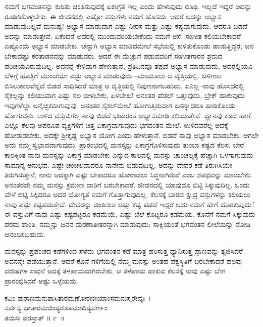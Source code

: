 ನಮಗೆ ಭಗವಂತನನ್ನು ಕುರಿತು ಚಿಂತಿಸುವುದಕ್ಕೆ ಏಕಾಗ್ರತೆ ಇಲ್ಲ ಎಂದು ಹೇಳುವುದು ರೂಢಿ. ಇಲ್ಲದೆ ಇದ್ದರೆ ಅದನ್ನು ರೂಢಿಸಿಕೊಳ್ಳಬೇಕು. ಈ ಜೀವನದಲ್ಲಿ ಎಷ್ಟೋ ವಸ್ತುಗಳು ನಮಗೆ ಹೊಸದು. ಆದರೆ ಅದನ್ನು ಅಭ್ಯಾಸ ಮಾಡುವುದಿಲ್ಲವೆ ಮನುಷ್ಯ! ಅಭ್ಯಾಸ ಮಾಡುವಾಗ ಎಷ್ಟು ನೀರಸ ಮತ್ತು ಎಷ್ಟು ಕಷ್ಟವಾಗುವುದು. ಆದರೂ ಬಿಡದೆ ಅದನ್ನು ಮಾಡುತ್ತೇವೆ. ಏಕೆಂದರೆ ಅದರಲ್ಲಿ ಮುಂದುವರಿಯಬೇಕೆಂದು ನಮಗೆ ಆಸೆ. ಸಂಗೀತ ಕಲಿಯಬೇಕಾದರೆ ಎಷ್ಟೊಂದು ಅಭ್ಯಾಸ ಮಾಡಬೇಕು. ಚೆನ್ನಾಗಿ ಅಭ್ಯಾಸ ಮಾಡಿದಮೇಲೆ ಸಭೆಯಲ್ಲಿ ಕುಳಿತುಕೊಂಡು ಹಾಡುತ್ತಿದ್ದರೆ, ಜನ ಬೇಕಾದಷ್ಟು ಕರತಾಡನವನ್ನು ಮಾಡುವರು. ಆದರೆ ಈ ಮೆಚ್ಚುಗೆ ಪಡುವವರಿಗೆ ಸಂಗೀತಗಾರನ ಶ್ರಮದ ಪರಿಚಯವಿರುವುದಿಲ್ಲ. ಅವನನ್ನೆ ಕೇಳಿದಾಗ ಹೇಳುತ್ತಾನೆ, ಪ್ರತಿದಿನವೂ ತಪ್ಪದೆ ಅಭ್ಯಾಸ ಮಾಡುವುದು, ಅದರಲ್ಲಿಯೂ ಬೆಳಗ್ಗೆ ಹೊತ್ತಿಗೆ ಮುಂಚೆಯೇ ಎದ್ದು ಅಭ್ಯಾಸ ಮಾಡುವುದು –ಮಾಮೂಲು ಆ ವೃತ್ತಿಯಲ್ಲಿ. ಚಳಿಗಾಲ ಬಿಸಿಲುಕಾಲವೆನ್ನದೆ ಬಿಡದೆ ಸಾಧಿಸಿದರೆ ಮಾತ್ರ ಆ ವೃತ್ತಿಯಲ್ಲಿ ನಿಪುಣನಾಗಬಹುದು. ಏನಿಲ್ಲ–ನಾವು ಹೊಸದರಲ್ಲಿ ಸೈಕಲ್ಲನ್ನು ಕಲಿಯುವಾಗ ಎಷ್ಟು ಸಲ ಬೀಳಬೇಕು, ಏಳಬೇಕು! ಅನಂತರ ಪೆಡಲ್ ಒತ್ತುವುದು, ಬ್ರೇಕ್ ಹಾಕುವುದು ಇವುಗಳೆಲ್ಲಾ ಅನೈಚ್ಛಿಕವಾಗುವುವು. ಅನಂತರ ಸೈಕಲ್​ಮೇಲೆ ಹೋಗುತ್ತಿರುವಾಗ ಏನನ್ನಾದರೂ ಹಾಡಿಕೊಂಡು ಹೋಗುವನು. ಉಳಿದ ವಸ್ತುವಿಗೆಲ್ಲ ನಾವು ಬಿಡದೆ ಭಂಡರಂತೆ ಅಭ್ಯಾಸಮಾಡಿ ಕಲಿಯುತ್ತೇವೆ. ಧ್ಯಾನವು ಕೂಡ ಹಾಗೆ. ಎಲ್ಲೊ ಕೆಲವು ಅಪರೂಪ ವ್ಯಕ್ತಿಗಳಿಗೆ ಚಿತ್ತ ಏಕಾಗ್ರವಾಗುವುದು ಭಗವಂತನ ಮೇಲೆ. ಉಳಿದವರೆಲ್ಲ ಅದಕ್ಕೆ ಹೋರಾಡಬೇಕು. ಅದಕ್ಕೇ ಶ‍್ರೀಕೃಷ್ಣ ಅಭ್ಯಾಸ ಯೋಗ ಎಂದು ಹೇಳುತ್ತಾನೆ. ಬಿಡದೆ ನಾವು ಅಭ್ಯಾಸ ಮಾಡಬೇಕು. ಆಗಲೇ ಅದು ನಮ್ಮ ಸ್ವಭಾವವಾಗುವುದು. ಪ್ರಾರಂಭದಲ್ಲಿ ಮನಸ್ಸನ್ನು ಏಕಾಗ್ರಗೊಳಿಸುವುದು ತುಂಬಾ ಕಷ್ಟದ ಕೆಲಸ. ಬೇರೆ ಕಾಲಕ್ಕಿಂತ ನಾವು ಮನಸ್ಸನ್ನು ಏಕಾಗ್ರ ಮಾಡಬೇಕು ಎನ್ನುವ ಕಾಲದಲ್ಲಿ ಮನಸ್ಸು ಚಾಂಚಲ್ಯಕ್ಕೆ ಹೆಚ್ಚಾಗಿ ಒಳಗಾಗುವುದು ಸಾಮಾನ್ಯ ಅನುಭವ. ಎಷ್ಟೇ ಚಂಚಲವಾದರೂ ನಾನೇನು ಬಿಡುವುದಿಲ್ಲ, ಅದನ್ನು ದೇವರ ಕಡೆ ತಿರುಗಿಸಿಯೇ ತಿರುಗಿಸುತ್ತೇನೆ, ನಾನು ಅದಕ್ಕಾಗಿ ಎಷ್ಟು ಬೇಕಾದರೂ ಹೋರಾಡಲು ಸಿದ್ಧನಾಗಿರುವೆ ಎಂಬ ಶಪಥವನ್ನು ಮಾಡಬೇಕು. ಅನಂತರವೇ ನಮ್ಮ ಮನಸ್ಸು ಕ್ರಮೇಣ ದಾರಿಗೆ ಬರಬೇಕಾದರೆ. ಜೀವನದಲ್ಲಿ ಯಾವುದೂ ಬಿಟ್ಟಿ ಸಿಕ್ಕುವುದಿಲ್ಲ. ಒಂದು ವೇಳೆ ಬಿಟ್ಟಿ ಸಿಕ್ಕಿದರೂ ಅದರ ಯೋಗ್ಯತೆ ನಮಗೆ ಗೊತ್ತಾಗುವುದಿಲ್ಲ. ಕೆಲಸಕ್ಕೆ ಬಾರದ ಕ್ಷುದ್ರ ವಸ್ತುಗಳನ್ನು ಕಲಿಯಲು ನಾವು ಎಷ್ಟು ಕಷ್ಟಪಡುತ್ತೇವೆ. ದೇವರನ್ನು ಚಿಂತಿಸಲು ಅಷ್ಟು ಕಷ್ಟ ಪಡದೆ ಇದ್ದರೆ ಅದು ನಮಗೆ ಹೇಗೆ ದೊರಕುವುದು? ಈ ವಸ್ತುವಿಗೆ ನಾವು ಎಷ್ಟು ಕಷ್ಟಪಟ್ಟರೂ ಕಡಮೆಯೆ, ಎಷ್ಟು ಬೆಲೆ ಕೊಟ್ಟರೂ ಕಡಮೆಯೆ. ಕೊನೆಗೆ ನಮಗೆ ಸಿಕ್ಕುವುದು ಪರಮ ಶಾಂತಿ; ನಮ್ಮನ್ನು ಜನನ ಮರಣಾತೀತರನ್ನಾಗಿ ಮಾಡುವುದು; ಸಾಕ್ಷಿಯಂತೆ ಭಗವಂತನ ಲೀಲೆಯನ್ನು ನೋಡಿ ಆನಂದಿಸಬಹುದು.

ಮನಸ್ಸನ್ನು ಪ್ರಪಂಚದ ಕಡೆಗಳಿಂದ ಸೆಳೆದು ಭಗವಂತನ ಕಡೆ ಮಾತ್ರ ಹರಿಸುತ್ತ ಧ್ಯಾನಿಸುತ್ತ ಪ್ರಾಣವನ್ನು ತ್ಯಜಿಸಿದರೆ ಅವನನ್ನೇ ಪಡೆಯುತ್ತಾನೆ. ಆದರೆ ಕೊನೆ ಗಳಿಗೆಯಲ್ಲಿ ನಮ್ಮ ಮನಸ್ಸು ಅಂತಹ ಪಕ್ವಸ್ಥಿತಿಗೆ ಬರಬೇಕಾದರೆ ಹಲವು ವರುಷಗಳ ಸಾಧನೆ ಅದಕ್ಕೆ ತಳಪಾಯವಾಗಿರಬೇಕು. ಆ ತಳಪಾಯ ಹಾಕುವ ಕೆಲಸಕ್ಕೆ ನಾವು ಎಷ್ಟು ಬೇಗ ಪ್ರಾರಂಭಿಸಿದರೆ ಅಷ್ಟು ಒಳ್ಳೆಯದು.

\begin{shloka}
ಕವಿಂ ಪುರಾಣಮನುಶಾಸಿತಾರಮಣೋರಣೀಯಾಂಸಮನುಸ್ಮರೇದ್ಯಃ~।\\ಸರ್ವಸ್ಯ ಧಾತಾರಮಚಿಂತ್ಯರೂಪಮಾದಿತ್ಯವರ್ಣಂ\\ ತಮಸಃ ಪರಸ್ತಾತ್ \hfill॥ ೯~॥
\end{shloka}

